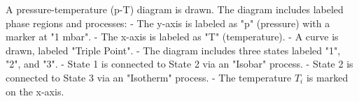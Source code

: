 A pressure-temperature (p-T) diagram is drawn. The diagram includes labeled phase regions and processes:  
- The y-axis is labeled as "p" (pressure) with a marker at "1 mbar".  
- The x-axis is labeled as "T" (temperature).  
- A curve is drawn, labeled "Triple Point".  
- The diagram includes three states labeled "1", "2", and "3".  
  - State 1 is connected to State 2 via an "Isobar" process.  
  - State 2 is connected to State 3 via an "Isotherm" process.  
- The temperature \( T_i \) is marked on the x-axis.